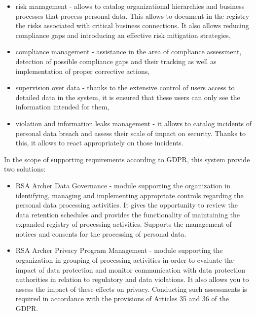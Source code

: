 \documentclass[en, noamssymb]{mgr}
\begin{document}
\begin{itemize}

\item risk management - allows to catalog organizational hierarchies and business processes that process personal data. This allows to document in the registry the risks associated with critical business connections. It also allows reducing compliance gaps and introducing an effective risk mitigation strategies,

\item compliance management - assistance in the area of compliance assessment, detection of possible compliance gaps and their tracking as well as implementation of proper corrective actions,

\item supervision over data - thanks to the extensive control of users access to detailed data in the system, it is ensured that these users can only see the information intended for them,

\item violation and information leaks management - it allows to catalog incidents of personal data breach and assess their scale of impact on security. Thanks to this, it allows to react appropriately on those incidents.

\end{itemize}

In the scope of supporting requirements according to GDPR, this system provide two solutions:

\begin{itemize}

\item RSA Archer Data Governance - module supporting the organization in identifying, managing and implementing appropriate controls regarding the personal data processing activities. It gives the opportunity to review the data retention schedules and provides the functionality of maintaining the expanded registry of processing activities. Supports the management of notices and consents for the processing of personal data.

\item RSA Archer Privacy Program Management - module supporting the organization in grouping of processing activities in order to evaluate the impact of data protection and monitor communication with data protection authorities in relation to regulatory and data violations. It also allows you to assess the impact of these effects on privacy. Conducting such assessments is required in accordance with the provisions of Articles 35 and 36 of the GDPR.

\end{itemize}
\end{document}
